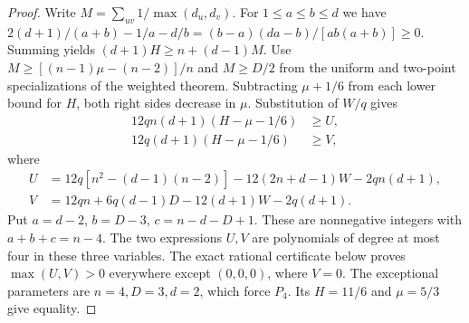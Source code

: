 \documentclass[11pt,a4paper]{article}
\begin{document}
\begin{proof}
Write $M=\sum_{uv}1/\max(d_u,d_v)$. For $1\le a\le b\le d$ we have $2(d+1)/(a+b)-1/a-d/b=(b-a)(da-b)/[ab(a+b)]\ge0$. Summing yields $(d+1)H\ge n+(d-1)M$. Use
$M\ge[(n-1)\mu-(n-2)]/n$ and $M\ge D/2$ from the uniform and two-point specializations of the weighted theorem. Subtracting $\mu+1/6$ from each lower bound for $H$, both right sides decrease in $\mu$. Substitution of $W/q$ gives
\begin{align*}
 12qn(d+1)(H-\mu-1/6)&\ge U,\\
 12q(d+1)(H-\mu-1/6)&\ge V,
\end{align*}
where
\begin{align*}
 U&=12q[n^2-(d-1)(n-2)]-12(2n+d-1)W-2qn(d+1),\\
 V&=12qn+6q(d-1)D-12(d+1)W-2q(d+1).
\end{align*}
Put $a=d-2$, $b=D-3$, $c=n-d-D+1$. These are nonnegative integers with $a+b+c=n-4$. The two expressions $U,V$ are polynomials of degree at most four in these three variables. The exact rational certificate below proves $\max(U,V)>0$ everywhere except $(0,0,0)$, where $V=0$. The exceptional parameters are $n=4,D=3,d=2$, which force $P_4$. Its $H=11/6$ and $\mu=5/3$ give equality.
\end{proof}
\end{document}
